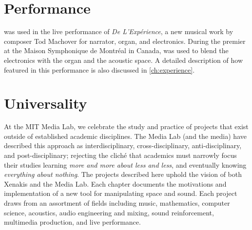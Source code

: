 \section{Performance}
\thesis was used in the live performance of \textit{De
  L'Exp\'{e}rience}, a new musical work by composer Tod Machover for
narrator, organ, and electronics. During the premier at the Maison
Symphonique de Montr\'{e}al in Canada, \thesis was used to blend the
electronics with the organ and the acoustic space.  A detailed
description of how \thesis featured in this performance is also
discussed in \autoref{ch:experience}.


\section{Universality}
\label{sec:universality}
At the MIT Media Lab, we celebrate the study and practice of projects
that exist outside of established academic disciplines. The Media Lab
(and the media) have described this approach as interdisciplinary,
cross-disciplinary, anti-disciplinary, and post-disciplinary; rejecting
the clich\'{e} that academics must narrowly focus their studies
learning \textit{more and more about less and less}, and eventually
knowing \textit{everything about nothing}.  The projects described
here uphold the vision of both Xenakis and the Media Lab. Each chapter
documents the motivations and implementation of a new tool for
manipulating space and sound. Each project draws from an assortment of
fields including music, mathematics, computer science, acoustics,
audio engineering and mixing, sound reinforcement, multimedia
production, and live performance. 



